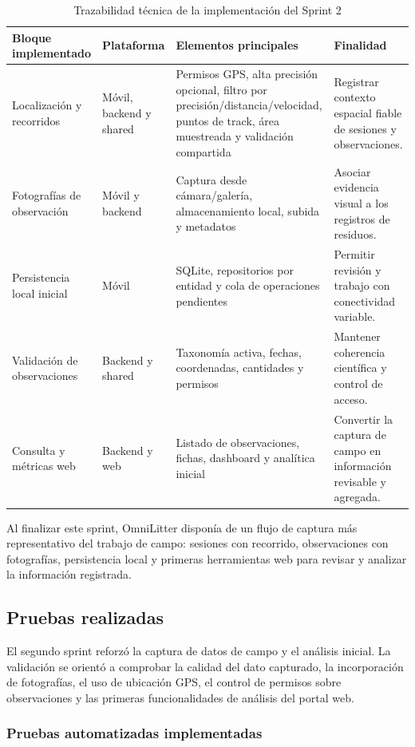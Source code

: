 \begin{table}[H]
\centering
\caption{Trazabilidad técnica de la implementación del Sprint 2}
\label{tab:implementacion_sprint2}
\scriptsize
\renewcommand{\arraystretch}{1.12}
\begin{tabularx}{\textwidth}{p{3.1cm}p{2.2cm}XX}
\toprule
Bloque implementado & Plataforma & Elementos principales & Finalidad \\
\midrule
Localización y recorridos & Móvil, backend y shared & Permisos GPS, alta precisión opcional, filtro por precisión/distancia/velocidad, puntos de track, área muestreada y validación compartida & Registrar contexto espacial fiable de sesiones y observaciones. \\
Fotografías de observación & Móvil y backend & Captura desde cámara/galería, almacenamiento local, subida y metadatos & Asociar evidencia visual a los registros de residuos. \\
Persistencia local inicial & Móvil & SQLite, repositorios por entidad y cola de operaciones pendientes & Permitir revisión y trabajo con conectividad variable. \\
Validación de observaciones & Backend y shared & Taxonomía activa, fechas, coordenadas, cantidades y permisos & Mantener coherencia científica y control de acceso. \\
Consulta y métricas web & Backend y web & Listado de observaciones, fichas, dashboard y analítica inicial & Convertir la captura de campo en información revisable y agregada. \\
\bottomrule
\end{tabularx}
\end{table}

Al finalizar este sprint, OmniLitter disponía de un flujo de captura más
representativo del trabajo de campo: sesiones con recorrido, observaciones con
fotografías, persistencia local y primeras herramientas web para revisar y
analizar la información registrada.
\subsection{Pruebas realizadas}

El segundo sprint reforzó la captura de datos de campo y el análisis inicial. La validación se orientó a comprobar la calidad del dato capturado, la incorporación de fotografías, el uso de ubicación GPS, el control de permisos sobre observaciones y las primeras funcionalidades de análisis del portal web.

\subsubsection{Pruebas automatizadas implementadas}


